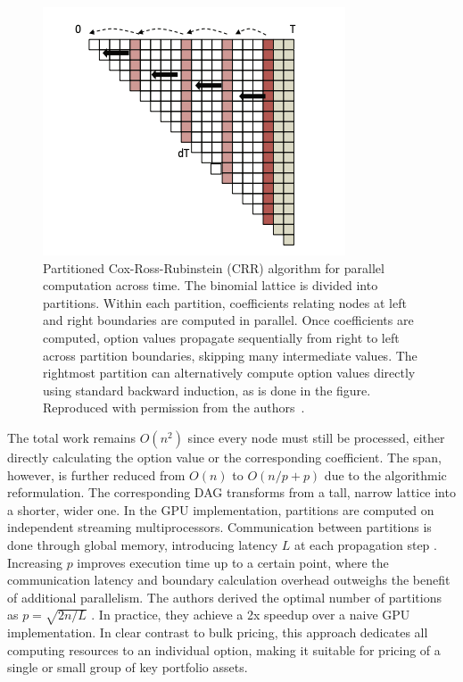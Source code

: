 \documentclass[english,12pt,a4paper,pdftex,sci,utf8]{aaltothesis}
\begin{document}
\begin{figure}[tb]
    \centering
    \includegraphics[scale=0.8]{External Images/CRRpartitioned.png}
    \caption{Partitioned Cox-Ross-Rubinstein (CRR) algorithm for parallel computation across time. The binomial lattice is divided into partitions. Within each partition, coefficients relating nodes at left and right boundaries are computed in parallel. Once coefficients are computed, option values propagate sequentially from right to left across partition boundaries, skipping many intermediate values. The rightmost partition can alternatively compute option values directly using standard backward induction, as is done in the figure. Reproduced with permission from the authors~\cite{ganesan2009acceleration}.}

    \label{fig:partitioned}
\end{figure}

The total work remains $O(n^2)$ since every node must still be processed, either directly calculating the option value or the corresponding coefficient. The span, however, is further reduced from $O(n)$ to $O(n/p + p)$ due to the algorithmic reformulation. The corresponding DAG transforms from a tall, narrow lattice into a shorter, wider one. In the GPU implementation, partitions are computed on independent streaming multiprocessors. Communication between partitions is done through global memory, introducing latency $L$ at each propagation step \cite{ganesan2009acceleration}. Increasing $p$ improves execution time up to a certain point, where the communication latency and boundary calculation overhead outweighs the benefit of additional parallelism. The authors derived the optimal number of partitions as $p = \sqrt{2n/L}$ \cite{ganesan2009acceleration}. In practice, they achieve a 2x speedup over a naive GPU implementation. In clear contrast to bulk pricing, this approach dedicates all computing resources to an individual option, making it suitable for pricing of a single or small group of key portfolio assets.
\clearpage
\end{document}
